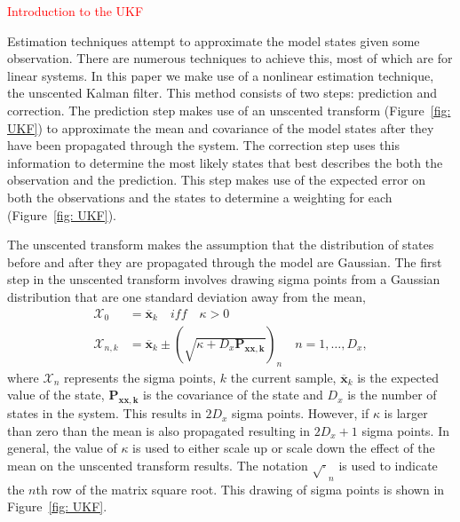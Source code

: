 \documentclass[10pt]{article}%
\newcommand\red{\textcolor{red}}
\begin{document}
\red{Introduction to the UKF}

Estimation techniques attempt to approximate the model states given some observation. There are numerous techniques to achieve this, most of which are for linear systems. In this paper we make use of a nonlinear estimation technique, the unscented Kalman filter. This method consists of two steps: prediction and correction. The prediction step makes use of an unscented transform (Figure~\ref{fig: UKF}) to approximate the mean and covariance of the model states after they have been propagated through the system. The correction step uses this information to determine the most likely states that best describes the both the observation and the prediction. This step makes use of the expected error on both the observations and the states to determine a weighting for each (Figure~\ref{fig: UKF}).

The unscented transform makes the assumption that the distribution of states before and after they are propagated through the model are Gaussian. The first step in the unscented transform involves drawing sigma points from a Gaussian distribution that are one standard deviation away from the mean, 
\begin{align}\label{eqn: SigmaP}
\mathbf{\mathcal{X}}_{0} &= \mathbf{\overline{x}}_{k} \quad iff \quad \kappa >0\\
\mathbf{\mathcal{X}}_{n,k} &= \mathbf{\overline{x}}_{k} \pm (\sqrt{\kappa+D_{x}\mathbf{P_{xx,k}}})_{n} \quad n=1,\hdots,D_x,
\end{align} where $\mathbf{\mathcal{X}}_{n}$ represents the sigma points, $k$ the current sample, $\mathbf{\overline{x}}_{k}$ is the expected value of the state, $\mathbf{P_{xx,k}}$ is the covariance of the state and $D_{x}$ is the number of states in the system. This results in $2D_{x}$ sigma points. However, if $\kappa$ is larger than zero than the mean is also propagated resulting in $2D_{x}+1$ sigma points. In general, the value of $\kappa$ is used to either scale up or scale down the effect of the mean on the unscented transform results. The notation $\sqrt{\cdot}_{n}$ is used to indicate the $n$th row of the matrix square root. This drawing of sigma points is shown in Figure~\ref{fig: UKF}.
\end{document}
